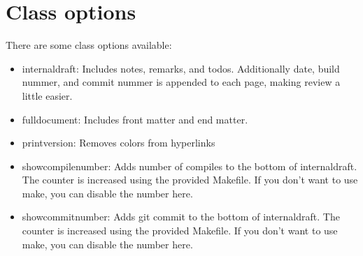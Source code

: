 \section{Class options}
\label{sec:classoptions}

There are some class options available:
\begin{itemize}
  \item internaldraft: Includes notes, remarks, and todos. Additionally date, build nummer, and commit nummer is appended to each page, making review a little easier.
  \item fulldocument: Includes front matter and end matter.
  \item printversion: Removes colors from hyperlinks
  \item showcompilenumber: Adds number of compiles to the bottom of internaldraft. The counter is increased using the provided Makefile. If you don't want to use make, you can disable the number here.
  \item showcommitnumber: Adds git commit to the bottom of internaldraft. The counter is increased using the provided Makefile. If you don't want to use make, you can disable the number here.
\end{itemize}

